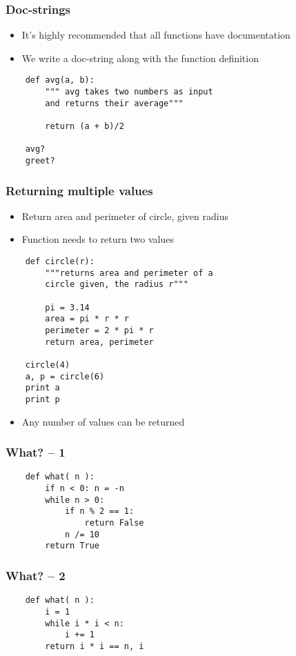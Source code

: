 \begin{frame}[fragile]
  \frametitle{Doc-strings}
  \begin{itemize}
  \item It's highly recommended that all functions have documentation
  \item We write a doc-string along with the function definition
  \end{itemize}
  \begin{lstlisting}
    def avg(a, b):
        """ avg takes two numbers as input 
        and returns their average"""

        return (a + b)/2
        
    avg?
    greet?
  \end{lstlisting}
\end{frame}

\begin{frame}[fragile]
  \frametitle{Returning multiple values}
  \begin{itemize}
  \item Return area and perimeter of circle, given radius
  \item Function needs to return two values
  \end{itemize}
  \begin{lstlisting}
    def circle(r):
        """returns area and perimeter of a 
        circle given, the radius r"""

        pi = 3.14
        area = pi * r * r
        perimeter = 2 * pi * r
        return area, perimeter

    circle(4)
    a, p = circle(6)
    print a
    print p
  \end{lstlisting}
  \begin{itemize}
  \item Any number of values can be returned
  \end{itemize}
\end{frame}

\begin{frame}[fragile]
  \frametitle{What? -- 1}
  \begin{lstlisting}       
    def what( n ):           
        if n < 0: n = -n     
        while n > 0:         
            if n % 2 == 1:   
                return False 
            n /= 10          
        return True          
  \end{lstlisting}         
\end{frame}

\begin{frame}[fragile]
  \frametitle{What? -- 2}
  \begin{lstlisting}
    def what( n ):
        i = 1
        while i * i < n:
            i += 1
        return i * i == n, i
  \end{lstlisting}
\end{frame}

